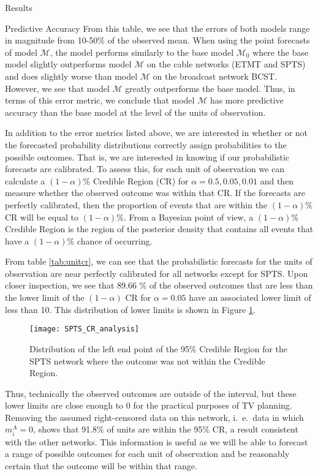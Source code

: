 \begin{chapter}{Results}
\begin{section}{Predictive Accuracy}
    From this table, we see that the errors of both models range in magnitude from 10-50\%
    of the observed mean. When using the point forecasts of model $\mathcal{M}$, the
    model performs similarly to the base model $\mathcal{M}_0$ where the base model slightly outperforms
    model $\mathcal{M}$ on the cable networks (ETMT and SPTS) and does slightly worse than model $\mathcal{M}$
    on the broadcast network BCST. However, we see that model $\mathcal{M}$ greatly outperforms the base model.
    Thus, in terms of this error metric, we conclude that model $\mathcal{M}$ has more predictive accuracy
    than the base model at the level of the units of observation.

    In addition to the error metrics listed above, we are interested in whether or not the forecasted
    probability distributions correctly assign probabilities to the possible outcomes. That is, we
    are interested in knowing if our probabilistic forecasts are calibrated. To assess this,
    for each unit of observation we can calculate a $(1 - \alpha)\%$ Credible Region (CR) for $\alpha = 0.5, 0.05, 0.01$
    and then measure whether the observed outcome was within that CR. If the forecasts are perfectly calibrated, then the proportion
    of events that are within the $(1 - \alpha)\%$ CR will be equal to $(1 - \alpha)\%$.
    From a Bayesian point of view, a $(1- \alpha)\%$ Credible Region is the region of the posterior density
    that contains all events that have a $(1- \alpha)\%$ chance of occurring.

    From table \ref{tab:unitcr}, we can see that the probabilistic forecasts for the units of observation
    are near perfectly calibrated for all networks except for SPTS. Upon closer inspection,
    we see that 89.66 \% of the observed outcomes that are less than the lower limit of the $(1 - \alpha)$ CR for $\alpha = 0.05$
    have an associated lower limit of less than 10. This distribution of lower limits is shown in
    Figure \ref{fig:cranalysis}.
    \begin{figure}[!h]
      \centering
      \texttt{[image: SPTS\_CR\_analysis]}
      \caption{Distribution of the left end point of the 95\% Credible Region for the SPTS network where the outcome was not within the Credible Region.}
      \label{fig:cranalysis}
    \end{figure}
    Thus, technically the observed outcomes are outside of the interval,
    but these lower limits are close enough to 0 for the practical purposes of TV planning.
    Removing the assumed right-censored data on this network, i.\ e.\ data in which $m_i^A = 0$,
    shows that 91.8\% of units are within the 95\% CR, a result consistent with the other networks.
    This information is useful as we will be able to forecast a range of possible outcomes for each
    unit of observation and be reasonably certain that the outcome will be within that range.


\end{section}
\end{chapter}
